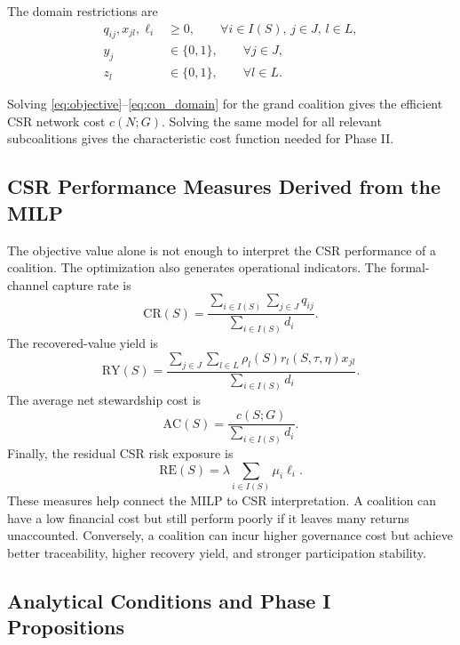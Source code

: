 The domain restrictions are
\begin{equation}
\label{eq:con_domain}
\begin{aligned}
q_{ij},x_{jl},\ell_i&\geq 0,
\qquad \forall i\in I(S),\, j\in J,\, l\in L,\\
y_j&\in\{0,1\},
\qquad \forall j\in J,\\
z_l&\in\{0,1\},
\qquad \forall l\in L.
\end{aligned}
\end{equation}

Solving \eqref{eq:objective}--\eqref{eq:con_domain} for the grand coalition gives the efficient CSR network cost $c(N;G)$. Solving the same model for all relevant subcoalitions gives the characteristic cost function needed for Phase II.

\subsection{CSR Performance Measures Derived from the MILP}

The objective value alone is not enough to interpret the CSR performance of a coalition. The optimization also generates operational indicators. The formal-channel capture rate is
\begin{equation}
\label{eq:ch4_capture_rate}
\mathrm{CR}(S)=
\frac{\sum_{i\in I(S)}\sum_{j\in J}q_{ij}}
{\sum_{i\in I(S)}d_i}.
\end{equation}
The recovered-value yield is
\begin{equation}
\label{eq:ch4_recovery_yield}
\mathrm{RY}(S)=
\frac{\sum_{j\in J}\sum_{l\in L}\rho_l(S)r_l(S,\tau,\eta)x_{jl}}
{\sum_{i\in I(S)}d_i}.
\end{equation}
The average net stewardship cost is
\begin{equation}
\label{eq:ch4_average_cost}
\mathrm{AC}(S)=
\frac{c(S;G)}
{\sum_{i\in I(S)}d_i}.
\end{equation}
Finally, the residual CSR risk exposure is
\begin{equation}
\label{eq:ch4_residual_risk}
\mathrm{RE}(S)=
\lambda\sum_{i\in I(S)}\mu_i\ell_i.
\end{equation}
These measures help connect the MILP to CSR interpretation. A coalition can have a low financial cost but still perform poorly if it leaves many returns unaccounted. Conversely, a coalition can incur higher governance cost but achieve better traceability, higher recovery yield, and stronger participation stability.

\subsection{Analytical Conditions and Phase I Propositions}

